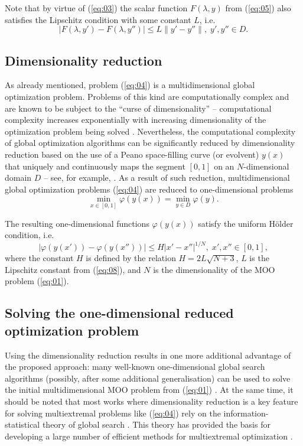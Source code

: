 \documentclass[runningheads]{llncs}
\begin{document}
Note that by virtue of (\ref{eq:03}) the scalar function $F(\lambda,y)$ from (\ref{eq:05}) also satisfies the Lipschitz condition with some constant $L$, i.e.
\begin{equation}
\label{eq:08}
|F(\lambda, y') - F(\lambda, y'')| \leq L\|y' - y''\|, \; y',y''\in D.
\end{equation}

\subsection{Dimensionality reduction} 
\label{subsec:32}

As already mentioned, problem (\ref{eq:04}) is a multidimensional global optimization problem. Problems of this kind are computationally complex and are known to be subject to the ``curse of dimensionality'' -- computational complexity increases exponentially with increasing dimensionality of the optimization problem being solved \cite{c13,c14,c15,c16,c17,c18,c19,c20}. Nevertheless, the computational complexity of global optimization algorithms can be significantly reduced by dimensionality reduction based on the use of a Peano space-filling curve (or evolvent) $y(x)$ that uniquely and continuously maps the segment $[0,1]$ on an $N$-dimensional domain $D$ -- see, for example, \cite{c15,c21}. As a result of such reduction, multidimensional global optimization problems (\ref{eq:04}) are reduced to one-dimensional problems
\begin{equation}
\label{eq:09}
\min_{x \in [0,1]} \varphi (y(x))= \min_{y \in D} \varphi(y).
\end{equation}

The resulting one-dimensional functions $\varphi(y(x))$ satisfy the uniform H{\" o}lder condition, i.e.
\begin{equation}
\label{eq:10}
|\varphi (y(x'))- \varphi (y(x''))| \leq H |x'-x''|^{1/N}, \; x',x''\in[0,1],
\end{equation}
where the constant $H$ is defined by the relation $H=2L\sqrt{N+3}$, $L$ is the Lipschitz constant from (\ref{eq:08}), and $N$ is the dimensionality of the MOO problem (\ref{eq:01}). 


\subsection{Solving the one-dimensional reduced optimization problem} 
\label{subsec:33}

Using the dimensionality reduction results in one more additional advantage of the proposed approach: many well-known one-dimensional global search algorithms (possibly, after some additional generalisation) can be used to solve the initial multidimensional MOO problem from (\ref{eq:01}) \cite{c22,c23,c24,c25,c26,c27,c28,c29}. At the same time, it should be noted that most works where dimensionality reduction is a key feature for solving multiextremal problems like (\ref{eq:04}) rely on the information-statistical theory of global search \cite{c15}. This theory has provided the basis for developing a large number of efficient methods for multiextremal optimization \cite{c28,c29,c30,c31,c32,c33,c34,c35,c36,c37}.
\end{document}
